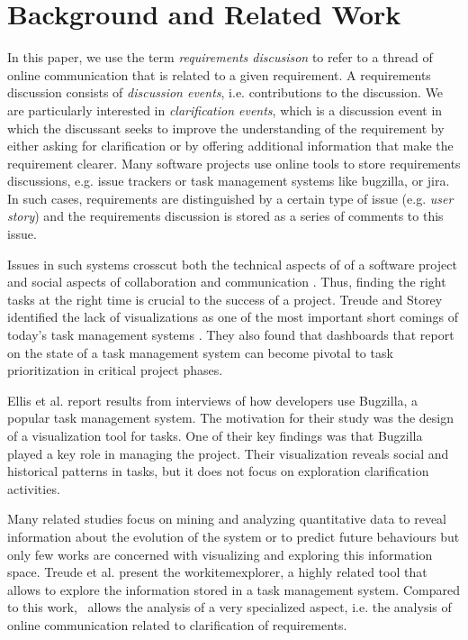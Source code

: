 \section{Background and Related Work}
In this paper, we use the term \emph{requirements discusison} to refer to a thread of online communication that is related to a given requirement. 
A requirements discussion consists of \emph{discussion events}, i.e. contributions to the discussion.
We are particularly interested in \emph{clarification events}, which is a discussion event in which the discussant seeks to improve the understanding of the requirement by either asking for clarification or by offering additional information that make the requirement clearer.
Many software projects use online tools to store requirements discussions, e.g. issue trackers or task management systems like bugzilla, or jira. 
In such cases, requirements are distinguished by a certain type of issue (e.g. \emph{user story}) and the requirements discussion is stored as a series of comments to this issue.

Issues in such systems crosscut both the technical aspects of of a software project and social aspects of collaboration and communication \cite{Kraut1995}. 
Thus, finding the right tasks at the right time is crucial to the success of a project.
Treude and Storey identified the lack of visualizations as one of the most important short comings of today's task management systems \cite{Treude2010}. They also found that dashboards that report on the state of a task management system can become pivotal to task prioritization in critical project phases.

Ellis et al. \cite{Ellis2007} report results from interviews of how developers use Bugzilla, a popular task management system. 
The motivation for their study was the design of a visualization tool for tasks. 
One of their key findings was that Bugzilla played a key role in managing the project. 
Their visualization reveals social and historical patterns in tasks, but it does not focus on exploration clarification activities.

Many related studies focus on mining and analyzing quantitative data to reveal information about the evolution of the system or to predict future behaviours but only few works are concerned with visualizing and exploring this information space. 
Treude et al. \cite{Treude2012} present the workitemexplorer, a highly related tool that allows to explore the information stored in a task management system.
Compared to this work, \viss\ allows the analysis of a very specialized aspect, i.e. the analysis of online communication related to clarification of requirements. 